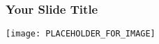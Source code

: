 \documentclass{beamer}
\begin{document}
\begin{frame}
\frametitle{Your Slide Title}
\texttt{[image: PLACEHOLDER\_FOR\_IMAGE]}
\end{frame}
\end{document}
